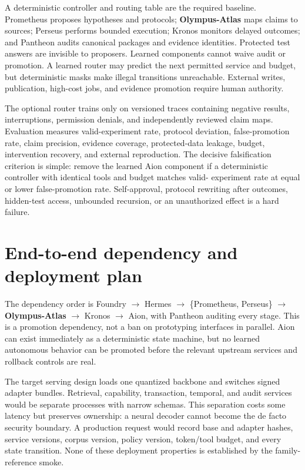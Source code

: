 \documentclass[10pt]{article}
\newcommand{\atlas}{\textbf{Olympus-Atlas}}
\begin{document}
A deterministic controller and routing table are the required baseline.
Prometheus proposes hypotheses and protocols; \atlas{} maps claims to sources;
Perseus performs bounded execution; Kronos monitors delayed outcomes; and
Pantheon audits canonical packages and evidence identities. Protected test
answers are invisible to proposers. Learned components cannot waive audit or
promotion. A learned router may predict the next permitted service and budget,
but deterministic masks make illegal transitions unreachable. External writes,
publication, high-cost jobs, and evidence promotion require human authority.

The optional router trains only on versioned traces containing negative
results, interruptions, permission denials, and independently reviewed claim
maps. Evaluation measures valid-experiment rate, protocol deviation,
false-promotion rate, claim precision, evidence coverage, protected-data
leakage, budget, intervention recovery, and external reproduction. The decisive
falsification criterion is simple: remove the learned Aion component if a
deterministic controller with identical tools and budget matches valid-
experiment rate at equal or lower false-promotion rate. Self-approval, protocol
rewriting after outcomes, hidden-test access, unbounded recursion, or an
unauthorized effect is a hard failure.

\section{End-to-end dependency and deployment plan}

The dependency order is Foundry $\rightarrow$ Hermes $\rightarrow$
\{Prometheus, Perseus\} $\rightarrow$ \atlas{} $\rightarrow$ Kronos
$\rightarrow$ Aion, with Pantheon auditing every stage. This is a promotion
dependency, not a ban on prototyping interfaces in parallel. Aion can exist
immediately as a deterministic state machine, but no learned autonomous behavior
can be promoted before the relevant upstream services and rollback controls are
real.

The target serving design loads one quantized backbone and switches signed
adapter bundles. Retrieval, capability, transaction, temporal, and audit
services would be separate processes with narrow schemas. This separation costs
some latency but preserves ownership: a neural decoder cannot become the de
facto security boundary. A production request would record base and adapter
hashes, service versions, corpus version, policy version, token/tool budget, and
every state transition. None of these deployment properties is established by
the family-reference smoke.
\end{document}
